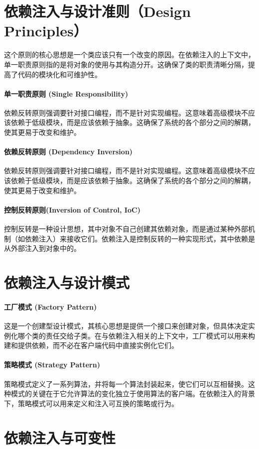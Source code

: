 \section{依赖注入与设计准则（Design Principles）}这个原则的核心思想是一个类应该只有一个改变的原因。在依赖注入的上下文中，单一职责原则指的是将对象的使用与其构造分开。这确保了类的职责清晰分隔，提高了代码的模块化和可维护性。
\paragraph{单一职责原则 (Single Responsibility)}依赖反转原则强调要针对接口编程，而不是针对实现编程。这意味着高级模块不应该依赖于低级模块，而是应该依赖于抽象。这确保了系统的各个部分之间的解耦，使其更易于改变和维护。
\paragraph{依赖反转原则 (Dependency Inversion)}依赖反转原则强调要针对接口编程，而不是针对实现编程。这意味着高级模块不应该依赖于低级模块，而是应该依赖于抽象。这确保了系统的各个部分之间的解耦，使其更易于改变和维护。
\paragraph{控制反转原则(Inversion of Control, IoC)}控制反转是一种设计思想，其中对象不自己创建其依赖对象，而是通过某种外部机制（如依赖注入）来接收它们。依赖注入是控制反转的一种实现形式，其中依赖是从外部注入到对象中的。

\section{依赖注入与设计模式}
\paragraph{工厂模式 (Factory Pattern)}这是一个创建型设计模式，其核心思想是提供一个接口来创建对象，但具体决定实例化哪个类的责任交给子类。在与依赖注入相关的上下文中，工厂模式可以用来构建和提供依赖，而不必在客户端代码中直接实例化它们。
\paragraph{策略模式 (Strategy Pattern)}
策略模式定义了一系列算法，并将每一个算法封装起来，使它们可以互相替换。这种模式的关键在于它允许算法的变化独立于使用算法的客户端。在依赖注入的背景下，策略模式可以用来定义和注入可互换的策略或行为。

\section{依赖注入与可变性}

